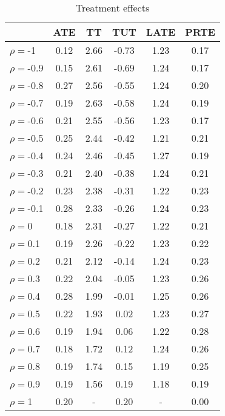 \begin{table}[htb]
\centering
\caption{Treatment effects}
\label{table:te}
\begin{tabular}{lccccc}
\hline
 & ATE & TT & TUT & LATE & PRTE \\
\hline\hline
$\rho=$-1 & 0.12 & 2.66 & -0.73 & 1.23 & 0.17 \\
$\rho=$-0.9 & 0.15 & 2.61 & -0.69 & 1.24 & 0.17 \\
$\rho=$-0.8 & 0.27 & 2.56 & -0.55 & 1.24 & 0.20 \\
$\rho=$-0.7 & 0.19 & 2.63 & -0.58 & 1.24 & 0.19 \\
$\rho=$-0.6 & 0.21 & 2.55 & -0.56 & 1.23 & 0.17 \\
$\rho=$-0.5 & 0.25 & 2.44 & -0.42 & 1.21 & 0.21 \\
$\rho=$-0.4 & 0.24 & 2.46 & -0.45 & 1.27 & 0.19 \\
$\rho=$-0.3 & 0.21 & 2.40 & -0.38 & 1.24 & 0.21 \\
$\rho=$-0.2 & 0.23 & 2.38 & -0.31 & 1.22 & 0.23 \\
$\rho=$-0.1 & 0.28 & 2.33 & -0.26 & 1.24 & 0.23 \\
$\rho=$0 & 0.18 & 2.31 & -0.27 & 1.22 & 0.21 \\
$\rho=$0.1 & 0.19 & 2.26 & -0.22 & 1.23 & 0.22 \\
$\rho=$0.2 & 0.21 & 2.12 & -0.14 & 1.24 & 0.23 \\
$\rho=$0.3 & 0.22 & 2.04 & -0.05 & 1.23 & 0.26 \\
$\rho=$0.4 & 0.28 & 1.99 & -0.01 & 1.25 & 0.26 \\
$\rho=$0.5 & 0.22 & 1.93 & 0.02 & 1.23 & 0.27 \\
$\rho=$0.6 & 0.19 & 1.94 & 0.06 & 1.22 & 0.28 \\
$\rho=$0.7 & 0.18 & 1.72 & 0.12 & 1.24 & 0.26 \\
$\rho=$0.8 & 0.19 & 1.74 & 0.15 & 1.19 & 0.25 \\
$\rho=$0.9 & 0.19 & 1.56 & 0.19 & 1.18 & 0.19 \\
$\rho=$1 & 0.20 & - & 0.20 & - & 0.00 \\
\hline
\end{tabular}
\end{table}
